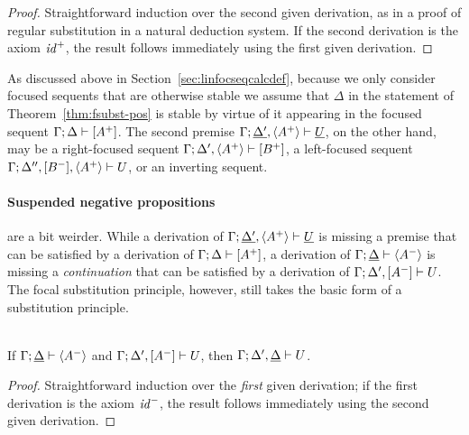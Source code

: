 \begin{proof}
  Straightforward induction over the second given derivation, as in a
  proof of regular substitution in a natural deduction system. If the
  second derivation is the axiom ${\it id}^+$, the result follows
  immediately using the first given derivation.
\end{proof}

\noindent
As discussed above in Section~\ref{sec:linfocseqcalcdef}, because we
only consider focused sequents that are otherwise stable we assume
that $\Delta$ in the statement of Theorem~\ref{thm:fsubst-pos} is
stable by virtue of it appearing in the focused sequent
${\Gamma};{\Delta} \vdash {[A^+]} \mathstrut$. The second premise
${\Gamma};{\underline{\Delta'}, \langle A^+
  \rangle} \vdash {\underline{U}} \mathstrut$, on the other hand, may be a right-focused
sequent ${\Gamma};{\Delta', \langle A^+ \rangle} \vdash {[B^+]} \mathstrut$, a
left-focused sequent ${\Gamma};{\Delta'', [B^-], \langle A^+
  \rangle} \vdash {U} \mathstrut$, or an inverting sequent.

\paragraph{Suspended negative propositions} are a bit weirder. While a derivation
of ${\Gamma};{\underline{\Delta'}, \langle A^+ \rangle} \vdash {\underline{U}} \mathstrut$
is missing a premise that can be satisfied by a derivation of
${\Gamma};{\Delta} \vdash {[A^+]} \mathstrut$, a derivation of 
${\Gamma};{\underline{\Delta}} \vdash {\langle A^- \rangle} \mathstrut$ is missing a 
{\it continuation} that can be satisfied by a derivation of
${\Gamma};{\Delta', [A^-]} \vdash {U} \mathstrut$. The focal substitution principle,
however, still takes the basic form of a substitution principle.

\bigskip
\begin{theorem}\label{thm:fsubst-neg}~\\
If ${\Gamma};{\underline{\Delta}} \vdash {\langle A^- \rangle} \mathstrut$
and ${\Gamma};{\Delta', [A^-]} \vdash {U} \mathstrut$, 
then ${\Gamma};{\Delta', \underline{\Delta}} \vdash {U} \mathstrut$. 
\end{theorem}

\begin{proof}
  Straightforward induction over the {\it first} given derivation; if
  the first derivation is the axiom ${\it id}^-$, the result follows
  immediately using the second given derivation.
\end{proof}


